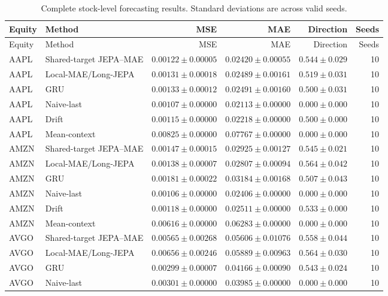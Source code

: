 \begin{longtable}{llrrrr}
\caption{Complete stock-level forecasting results. Standard deviations are across valid seeds.}\label{tab:appendix_stock_metrics}\\
\toprule
Equity & Method & MSE & MAE & Direction & Seeds \\
\midrule
\endfirsthead
\toprule
Equity & Method & MSE & MAE & Direction & Seeds \\
\midrule
\endhead
AAPL & Shared-target JEPA--MAE & $0.00122 \pm 0.00005$ & $0.02420 \pm 0.00055$ & $0.544 \pm 0.029$ & 10 \\
AAPL & Local-MAE/Long-JEPA & $0.00131 \pm 0.00018$ & $0.02489 \pm 0.00161$ & $0.519 \pm 0.031$ & 10 \\
AAPL & GRU & $0.00133 \pm 0.00012$ & $0.02491 \pm 0.00160$ & $0.500 \pm 0.031$ & 10 \\
AAPL & Naive-last & $0.00107 \pm 0.00000$ & $0.02113 \pm 0.00000$ & $0.000 \pm 0.000$ & 10 \\
AAPL & Drift & $0.00115 \pm 0.00000$ & $0.02218 \pm 0.00000$ & $0.500 \pm 0.000$ & 10 \\
AAPL & Mean-context & $0.00825 \pm 0.00000$ & $0.07767 \pm 0.00000$ & $0.000 \pm 0.000$ & 10 \\
AMZN & Shared-target JEPA--MAE & $0.00147 \pm 0.00015$ & $0.02925 \pm 0.00127$ & $0.545 \pm 0.021$ & 10 \\
AMZN & Local-MAE/Long-JEPA & $0.00138 \pm 0.00007$ & $0.02807 \pm 0.00094$ & $0.564 \pm 0.042$ & 10 \\
AMZN & GRU & $0.00181 \pm 0.00022$ & $0.03184 \pm 0.00168$ & $0.507 \pm 0.043$ & 10 \\
AMZN & Naive-last & $0.00106 \pm 0.00000$ & $0.02406 \pm 0.00000$ & $0.000 \pm 0.000$ & 10 \\
AMZN & Drift & $0.00118 \pm 0.00000$ & $0.02511 \pm 0.00000$ & $0.533 \pm 0.000$ & 10 \\
AMZN & Mean-context & $0.00616 \pm 0.00000$ & $0.06283 \pm 0.00000$ & $0.000 \pm 0.000$ & 10 \\
AVGO & Shared-target JEPA--MAE & $0.00565 \pm 0.00268$ & $0.05606 \pm 0.01076$ & $0.558 \pm 0.044$ & 10 \\
AVGO & Local-MAE/Long-JEPA & $0.00656 \pm 0.00246$ & $0.05889 \pm 0.00963$ & $0.564 \pm 0.030$ & 10 \\
AVGO & GRU & $0.00299 \pm 0.00007$ & $0.04166 \pm 0.00090$ & $0.543 \pm 0.024$ & 10 \\
AVGO & Naive-last & $0.00301 \pm 0.00000$ & $0.03985 \pm 0.00000$ & $0.000 \pm 0.000$ & 10 \\

\end{longtable}
